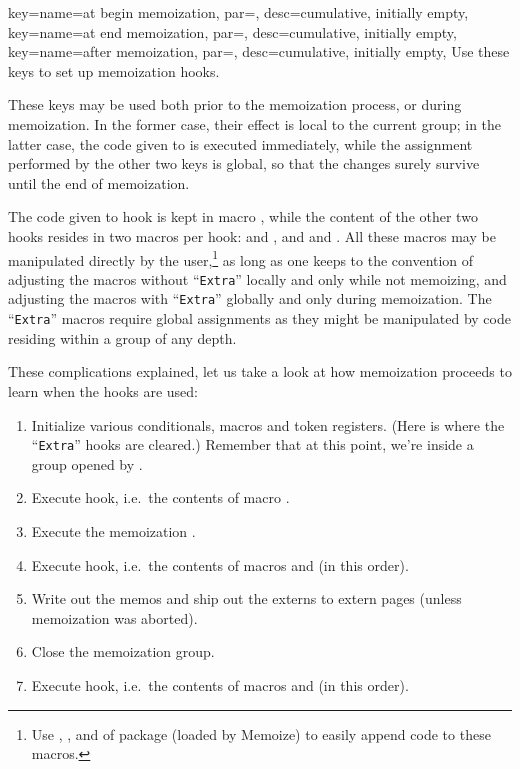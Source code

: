 \documentclass[a4paper,11pt]{article}
\begin{document}
\begin{doc}{
    key={name=at begin memoization, par=, desc={cumulative, initially empty}},
    key={name=at end memoization, par=, desc={cumulative, initially empty}},
    key={name=after memoization, par=, desc={cumulative, initially empty}},
  }
  Use these keys to set up memoization hooks.

  These keys may be used both prior to the memoization process, or during
  memoization.  In the former case, their effect is local to the current group;
  in the latter case, the code given to  is
  executed immediately, while the assignment performed by the other two keys is
  global, so that the changes surely survive until the end of memoization.

  The code given to hook  is kept in macro
  , while the content of the other two hooks
  resides in two macros per hook:  and
  , and 
  and . All these macros may be
  manipulated directly by the user,\footnote{Use , ,
     and  of package  (loaded by Memoize)
    to easily append code to these macros.} as long as one keeps to the
  convention of adjusting the macros without ``\texttt{Extra}'' locally and
  only while not memoizing, and adjusting the macros with ``\texttt{Extra}''
  globally and only during memoization.  The ``\texttt{Extra}'' macros require
  global assignments as they might be manipulated by code residing within a
   group of any depth.

  These complications explained, let us take a look at how memoization proceeds
  to learn when the hooks are used:
  \begin{enumerate}
  \item Initialize various conditionals, macros and token registers.  (Here is
    where the ``\texttt{Extra}'' hooks are cleared.)  Remember that at this
    point, we're inside a group opened by .
  \item Execute  hook, i.e.\ the contents of
    macro .
  \item Execute the memoization .
  \item Execute  hook, i.e.\ the contents of macros
     and  (in this
    order).
  \item Write out the memos and ship out the externs to extern pages (unless
    memoization was aborted).
  \item Close the memoization group.
  \item Execute  hook, i.e.\ the contents of
    macros  and 
    (in this order).
  \end{enumerate}
\end{doc}
\end{document}
